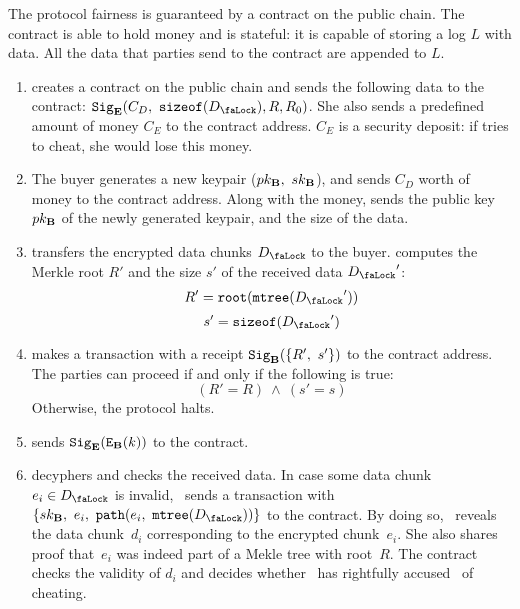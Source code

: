 The protocol fairness is guaranteed by a contract on the public chain. The contract is able to hold money and is stateful: it is capable of storing a log $L$ with data. All the data that parties send to the contract are appended to $L$.

\begin{enumerate}
\item {} creates a contract on the public chain and sends the following data to the contract: $\Sign_\Party{E}(C_D,\ \SizeOf(\Lock{D}), R, R_0)$. She also sends a predefined amount of money $C_E$ to the contract address. $C_E$ is a security deposit: if  tries to cheat, she would lose this money.
\item The buyer generates a new keypair ($pk_{\mathbf{B}},\ sk_{\mathbf{B}}$), and sends $C_D$ worth of money to the contract address. Along with the money,  sends the public key $pk_{\mathbf{B}}$ of the newly generated keypair, and the size of the data.
\item {} transfers the encrypted data chunks $\Lock{D}$ to the buyer.  computes the Merkle root $R'$ and the size $s'$ of the received data $\Lock{D}'$:
\begin{equation}
R' = \Root(\MerkleTree(\Lock{D}'))
\end{equation}
\begin{equation}
s' = \SizeOf(\Lock{D}')
\end{equation}
\item {} makes a transaction with a receipt $\mathtt{Sig}_{\mathbf{B}}(\{R',\ s'\})$ to the contract address. The parties can proceed if and only if the following is true:
\begin{equation}
(R' = R)\ \land\ (s' = s)
\end{equation}
Otherwise, the protocol halts.
\item {} sends $\mathtt{Sig}_{\mathbf{E}}(\mathtt{E}_{\mathbf{B}}(k))$ to the contract.
\item {} decyphers and checks the received data. In case some data chunk $e_i \in \Lock{D}$ is invalid, ~sends a transaction with~$\{\SecretKey{B},\ e_i,\ \Path(e_i,\ \MerkleTree(\Lock{D}))\}$ to the contract. By doing so, ~reveals the data chunk~$d_i$ corresponding to the encrypted chunk~$e_i$.  She also shares proof that~$e_i$ was indeed part of a  Mekle tree with root~$R$. The contract checks the validity of $d_i$ and decides whether ~has rightfully accused~ of cheating.
\end{enumerate}

